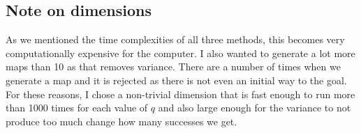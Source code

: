 \documentclass[11pt]{scrartcl} %
\begin{document}
\subsection{Note on dimensions}
As we mentioned the time complexities of all three methods, this becomes very computationally expensive for the computer. I also wanted to generate a lot more maps than 10 as that removes variance. There are a number of times when we generate a map and it is rejected as there is not even an initial way to the goal. For these reasons, I chose a non-trivial dimension that is fast enough to run more than 1000 times for each value of $q$ and also large enough for the variance to not produce too much change how many successes we get. 
\end{document}
